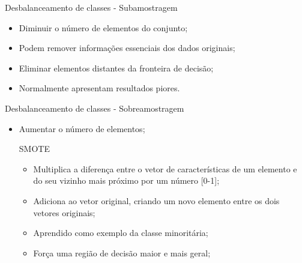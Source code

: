 \documentclass{beamer}
\begin{document}
\begin{frame}{Desbalanceamento de classes - Subamostragem}
\setlength\leftmargini{0em}
\justifying
    \begin{itemize}
        \item Diminuir o número de elementos do conjunto;
        \item Podem remover informações essenciais dos dados originais;
        \item Eliminar elementos distantes da fronteira de decisão;
        \item Normalmente apresentam resultados piores.
    \end{itemize}
\end{frame}
\begin{frame}{Desbalanceamento de classes - Sobreamostragem}
\setlength\leftmargini{0em}
\justifying
    \begin{itemize}
        \item Aumentar o número de elementos;
    \begin{block}{SMOTE}
\setlength\leftmargini{1em}
        \begin{itemize}
            \item Multiplica a diferença entre o vetor de características de um elemento e do seu vizinho mais próximo por um número [0-1];
            \item Adiciona ao vetor original, criando um novo elemento entre os dois vetores originais;
            \item Aprendido como exemplo da classe minoritária;
            \item Força uma região de decisão maior e mais geral;
        \end{itemize}
    \end{block}
    \end{itemize}
\end{frame}
\end{document}
